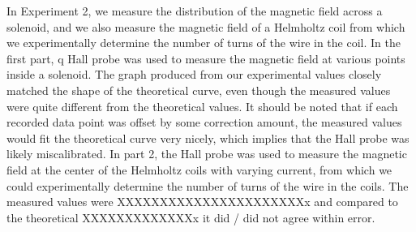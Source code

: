 \documentclass[letterpaper]{article}
\begin{document}
In Experiment 2, we measure the distribution of the magnetic field across a solenoid,
and we also measure the magnetic field of a Helmholtz coil from which we experimentally determine the
number of turns of the wire in the coil. In the first part, q Hall probe was used to measure the magnetic field
at various points inside a solenoid. The graph produced from our experimental values
closely matched the shape of the theoretical curve, even though the measured values were
quite different from the theoretical values. It should be noted that if each recorded
data point was offset by some correction amount, the measured values would fit the
theoretical curve very nicely, which implies that the Hall probe
was likely miscalibrated. In part 2, the Hall probe was used to measure the magnetic field
at the center of the Helmholtz coils with varying current, from which we could experimentally
determine the number of turns of the wire in the coils. The measured values were XXXXXXXXXXXXXXXXXXXXXXx
and compared to the theoretical XXXXXXXXXXXXXx it did / did not agree within error.


\end{document}
